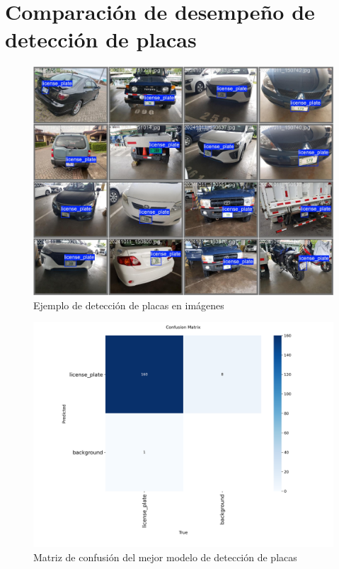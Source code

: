 \section{Comparación de desempeño de detección de placas}

\begin{figure}[H]
	\includegraphics[width=\textwidth]{fig/proy/ejemplo-deteccion-placas.jpg}
	\caption{Ejemplo de detección de placas en imágenes}
	\label{fig:ejemplo-deteccion-placa}
\end{figure}

\begin{figure}[H]
	\includegraphics[width=\textwidth]{fig/proy/confusion_matrix-new-model.png}
	\caption{Matriz de confusión del mejor modelo de detección de placas}
	\label{fig:mejor-modelo-yolo}
\end{figure}

